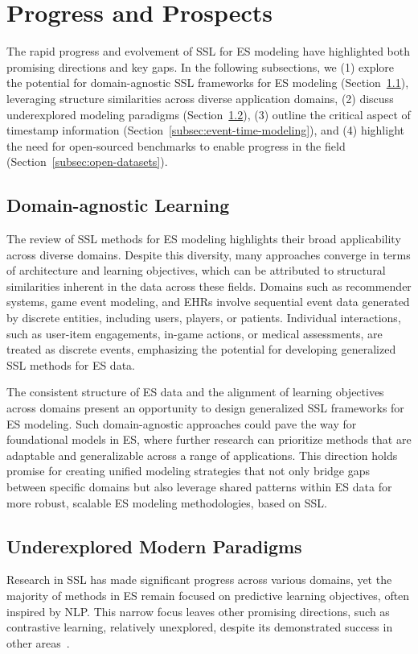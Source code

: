 \documentclass[twoside,11pt]{article}
\begin{document}
\section{Progress and Prospects}
\label{sec:progress-prospects}

The rapid progress and evolvement of SSL for ES modeling have highlighted both promising directions and key gaps. In the following subsections, we (1) explore the potential for domain-agnostic SSL frameworks for ES modeling (Section~\ref{subsec:domain-agnostic-learning}), leveraging structure similarities across diverse application domains, (2) discuss underexplored modeling paradigms (Section~\ref{subsec:underexplored-modern-paradigms}), (3) outline the critical aspect of timestamp information (Section~\ref{subsec:event-time-modeling}), and (4) highlight the need for open-sourced benchmarks to enable progress in the field (Section~\ref{subsec:open-datasets}).

\subsection{Domain-agnostic Learning}
\label{subsec:domain-agnostic-learning}
The review of SSL methods for ES modeling highlights their broad applicability across diverse domains. Despite this diversity, many approaches converge in terms of architecture and learning objectives, which can be attributed to structural similarities inherent in the data across these fields. Domains such as recommender systems, game event modeling, and EHRs involve sequential event data generated by discrete entities, including users, players, or patients. Individual interactions, such as user-item engagements, in-game actions, or medical assessments, are treated as discrete events, emphasizing the potential for developing generalized SSL methods for ES data.

The consistent structure of ES data and the alignment of learning objectives across domains present an opportunity to design generalized SSL frameworks for ES modeling. Such domain-agnostic approaches could pave the way for foundational models in ES, where further research can prioritize methods that are adaptable and generalizable across a range of applications. This direction holds promise for creating unified modeling strategies that not only bridge gaps between specific domains but also leverage shared patterns within ES data for more robust, scalable ES modeling methodologies, based on SSL.

\subsection{Underexplored Modern Paradigms}
\label{subsec:underexplored-modern-paradigms}
Research in SSL has made significant progress across various domains, yet the majority of methods in ES remain focused on predictive learning objectives, often inspired by NLP. This narrow focus leaves other promising directions, such as contrastive learning, relatively unexplored, despite its demonstrated success in other areas~.
\end{document}
